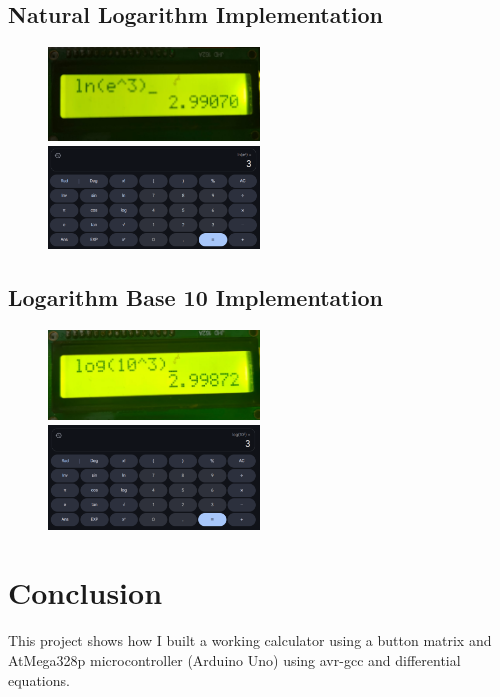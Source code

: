 \documentclass[a4paper,12pt]{article}
\begin{document}
\subsection{Natural Logarithm Implementation}
\begin{figure}[!htb]
    {\includegraphics[width=0.5\textwidth]{./figs/ln.png}}
    \hspace{\fill}
    {\includegraphics[width=0.5\textwidth]{./figs/ln_calc.png}}
\end{figure}

\subsection{Logarithm Base 10 Implementation}
\begin{figure}[!htb]
    {\includegraphics[width=0.5\textwidth]{./figs/log.png}}
    \hspace{\fill}
    {\includegraphics[width=0.5\textwidth]{./figs/log_calc.png}}
\end{figure}

\section*{Conclusion}
This project shows how I built a working calculator using a button matrix and AtMega328p microcontroller (Arduino Uno) using avr-gcc and differential equations.
\end{document}
